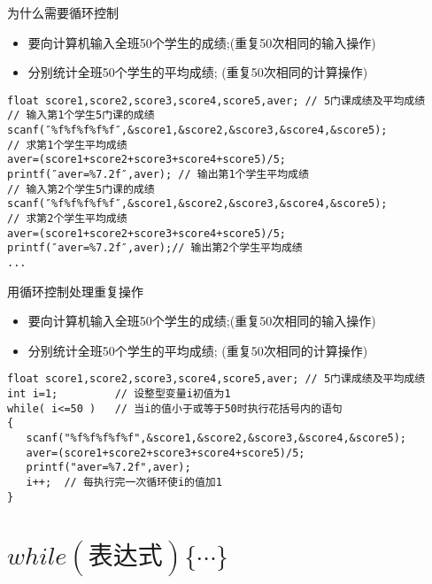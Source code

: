 
\begin{frame}{为什么需要循环控制}
\vspace{-0.2cm}
\begin{itemize}
	\item 要向计算机输入全班50个学生的成绩;(重复50次相同的输入操作)
	\item 分别统计全班50个学生的平均成绩;	(重复50次相同的计算操作)
\end{itemize}
\begin{lstlisting}[frame=lines]
float score1,score2,score3,score4,score5,aver; // 5门课成绩及平均成绩
// 输入第1个学生5门课的成绩
scanf(″%f%f%f%f%f″,&score1,&score2,&score3,&score4,&score5);
// 求第1个学生平均成绩
aver=(score1+score2+score3+score4+score5)/5;
printf(″aver=%7.2f″,aver); // 输出第1个学生平均成绩
// 输入第2个学生5门课的成绩
scanf(″%f%f%f%f%f″,&score1,&score2,&score3,&score4,&score5);
// 求第2个学生平均成绩
aver=(score1+score2+score3+score4+score5)/5;
printf(″aver=%7.2f″,aver);// 输出第2个学生平均成绩
...
\end{lstlisting}
\end{frame}

\begin{frame}{用循环控制处理重复操作}
\begin{itemize}
	\item 要向计算机输入全班50个学生的成绩;(重复50次相同的输入操作)
	\item 分别统计全班50个学生的平均成绩;	(重复50次相同的计算操作)
\end{itemize}
\begin{lstlisting}[frame=lines]
float score1,score2,score3,score4,score5,aver; // 5门课成绩及平均成绩
int i=1;         // 设整型变量i初值为1   
while( i<=50 )   // 当i的值小于或等于50时执行花括号内的语句
{
   scanf("%f%f%f%f%f",&score1,&score2,&score3,&score4,&score5);
   aver=(score1+score2+score3+score4+score5)/5; 
   printf("aver=%7.2f",aver);
   i++;  // 每执行完一次循环使i的值加1 
}   
\end{lstlisting}
\end{frame}

\section{$while(\text{表达式})\{ \cdots\}$}

